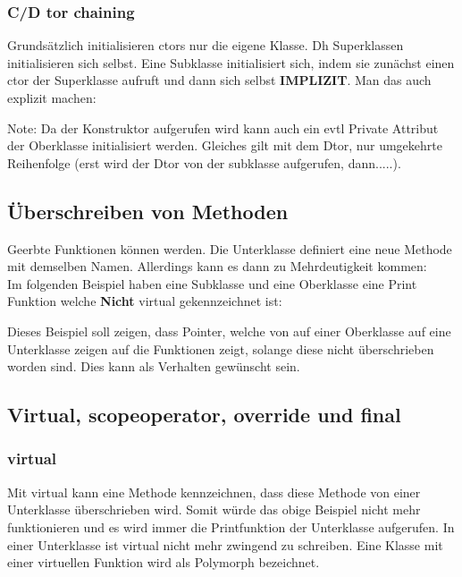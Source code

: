 \subsubsection{C/D tor chaining}

Grundsätzlich initialisieren ctors nur die eigene Klasse. 
Dh Superklassen initialisieren sich selbst. 
Eine Subklasse initialisiert sich, indem sie zunächst einen ctor der Superklasse aufruft und dann sich selbst \textbf{IMPLIZIT}. 
Man das auch explizit machen:



Note: Da der Konstruktor aufgerufen wird kann auch ein evtl Private Attribut der Oberklasse initialisiert werden.
Gleiches gilt mit dem Dtor, nur umgekehrte Reihenfolge (erst wird der Dtor von der subklasse aufgerufen, dann.....).

\subsection{Überschreiben von Methoden}

Geerbte Funktionen können  werden. 
Die Unterklasse definiert eine neue Methode mit demselben Namen.
Allerdings kann es dann zu Mehrdeutigkeit kommen:\\
Im folgenden Beispiel haben eine Subklasse und eine Oberklasse eine Print Funktion welche \textbf{Nicht} virtual gekennzeichnet ist:




Dieses Beispiel soll zeigen, dass Pointer, welche von auf einer Oberklasse auf eine Unterklasse zeigen auf die  Funktionen zeigt, solange diese nicht überschrieben worden sind.
Dies kann als Verhalten gewünscht sein. 


\subsection{Virtual, scopeoperator, override und final}

\subsubsection{virtual}

Mit virtual kann eine Methode kennzeichnen, dass diese Methode von einer Unterklasse überschrieben wird.
Somit würde das obige Beispiel nicht mehr funktionieren und es wird immer die Printfunktion der Unterklasse aufgerufen. 
In einer Unterklasse ist virtual nicht mehr zwingend zu schreiben.
Eine Klasse mit einer virtuellen Funktion wird als Polymorph bezeichnet.

